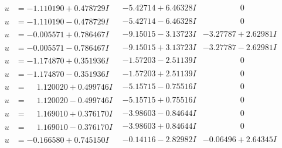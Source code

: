 \documentclass[1p]{elsarticle_modified}
\theoremstyle{definition}
\begin{document}
$$\begin{array}{c|c|c}
 \hline 
\begin{aligned}
u &= -1.110190 + 0.478729 I\end{aligned}
 & -5.42714 + 6.46328 I & \phantom{-0.000000 } 0 \\ \hline\begin{aligned}
u &= -1.110190 - 0.478729 I\end{aligned}
 & -5.42714 - 6.46328 I & \phantom{-0.000000 } 0 \\ \hline\begin{aligned}
u &= -0.005571 + 0.786467 I\end{aligned}
 & -9.15015 - 3.13723 I & -3.27787 + 2.62981 I \\ \hline\begin{aligned}
u &= -0.005571 - 0.786467 I\end{aligned}
 & -9.15015 + 3.13723 I & -3.27787 - 2.62981 I \\ \hline\begin{aligned}
u &= -1.174870 + 0.351936 I\end{aligned}
 & -1.57203 - 2.51139 I & \phantom{-0.000000 } 0 \\ \hline\begin{aligned}
u &= -1.174870 - 0.351936 I\end{aligned}
 & -1.57203 + 2.51139 I & \phantom{-0.000000 } 0 \\ \hline\begin{aligned}
u &= \phantom{-}1.120020 + 0.499746 I\end{aligned}
 & -5.15715 - 0.75516 I & \phantom{-0.000000 } 0 \\ \hline\begin{aligned}
u &= \phantom{-}1.120020 - 0.499746 I\end{aligned}
 & -5.15715 + 0.75516 I & \phantom{-0.000000 } 0 \\ \hline\begin{aligned}
u &= \phantom{-}1.169010 + 0.376170 I\end{aligned}
 & -3.98603 - 0.84644 I & \phantom{-0.000000 } 0 \\ \hline\begin{aligned}
u &= \phantom{-}1.169010 - 0.376170 I\end{aligned}
 & -3.98603 + 0.84644 I & \phantom{-0.000000 } 0 \\ \hline\begin{aligned}
u &= -0.166580 + 0.745150 I\end{aligned}
 & -0.14116 - 2.82982 I & -0.06496 + 2.64345 I \\ \hline\begin{aligned}

\end{aligned}
\end{array}$$
\end{document}
